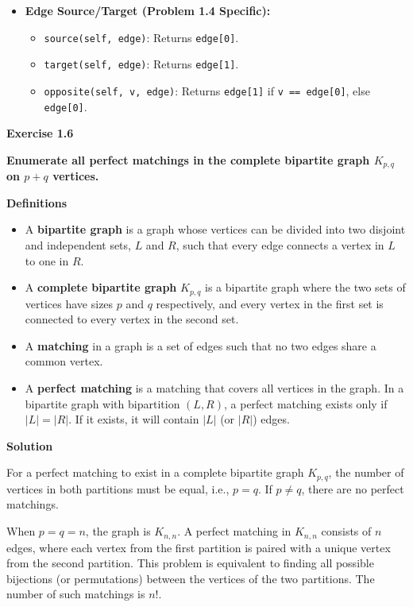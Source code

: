 \documentclass{article}
\begin{document}
\begin{itemize}
\begin{itemize}
        \item \textbf{Edge Source/Target (Problem 1.4 Specific):}
        \begin{itemize}
            \item \texttt{source(self, edge)}: Returns \texttt{edge[0]}.
            \item \texttt{target(self, edge)}: Returns \texttt{edge[1]}.
            \item \texttt{opposite(self, v, edge)}: Returns \texttt{edge[1]} if \texttt{v == edge[0]}, else \texttt{edge[0]}.
        \end{itemize}
    \end{itemize}
\end{itemize}

\textbf{Exercise 1.6}

\textbf{Enumerate all perfect matchings in the complete bipartite graph $K_{p,q}$ on $p + q$ vertices.}

\textbf{Definitions}

\begin{itemize}
    \item A \textbf{bipartite graph} is a graph whose vertices can be divided into two disjoint and independent sets, $L$ and $R$, such that every edge connects a vertex in $L$ to one in $R$.
    \item A \textbf{complete bipartite graph} $K_{p,q}$ is a bipartite graph where the two sets of vertices have sizes $p$ and $q$ respectively, and every vertex in the first set is connected to every vertex in the second set.
    \item A \textbf{matching} in a graph is a set of edges such that no two edges share a common vertex.
    \item A \textbf{perfect matching} is a matching that covers all vertices in the graph. In a bipartite graph with bipartition $(L, R)$, a perfect matching exists only if $|L| = |R|$. If it exists, it will contain $|L|$ (or $|R|$) edges.
\end{itemize}

\textbf{Solution}

For a perfect matching to exist in a complete bipartite graph $K_{p,q}$, the number of vertices in both partitions must be equal, i.e., $p = q$. If $p \neq q$, there are no perfect matchings.

When $p = q = n$, the graph is $K_{n,n}$. A perfect matching in $K_{n,n}$ consists of $n$ edges, where each vertex from the first partition is paired with a unique vertex from the second partition. This problem is equivalent to finding all possible bijections (or permutations) between the vertices of the two partitions. The number of such matchings is $n!$.
\end{document}

